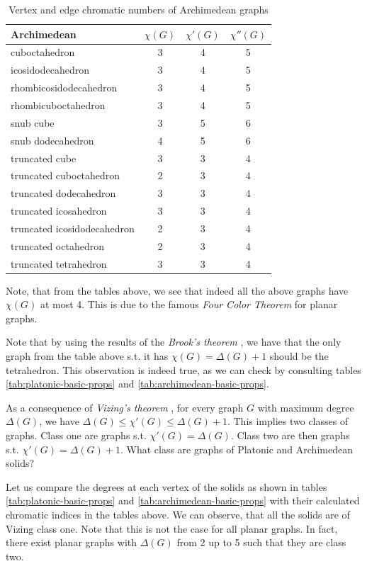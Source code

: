 \begin{table}[H]
\centering
\begin{tabular}{l@{\hspace{1.5cm}}ccc}
\toprule
\textbf{Archimedean} & \textbf{$\chi(G)$} & \textbf{$\chi'(G)$} & \textbf{$\chi''(G)$} \\
\midrule
cuboctahedron & 3 & 4 & 5 \\
icosidodecahedron & 3 & 4 & 5 \\
rhombicosidodecahedron & 3 & 4 & 5 \\
rhombicuboctahedron & 3 & 4 & 5 \\
snub cube & 3 & 5 & 6 \\
snub dodecahedron & 4 & 5 & 6 \\
truncated cube & 3 & 3 & 4 \\
truncated cuboctahedron & 2 & 3 & 4 \\
truncated dodecahedron & 3 & 3 & 4 \\
truncated icosahedron & 3 & 3 & 4 \\
truncated icosidodecahedron & 2 & 3 & 4 \\
truncated octahedron & 2 & 3 & 4 \\
truncated tetrahedron & 3 & 3 & 4 \\
\bottomrule
\end{tabular}
\caption{Vertex and edge chromatic numbers of Archimedean graphs}
\label{tab:archimedean-chrom-nums}
\end{table}

Note, that from the tables above, we see that indeed all the above graphs have $\chi(G)$ at most 4. This is due to the famous \textit{Four Color Theorem} \cite{appelhaken76} for planar graphs.

Note that by using the results of the \textit{Brook's theorem} \cite{brooks41}, we have that the only graph from the table above s.t. it has $\chi(G) = \Delta(G) + 1$ should be the tetrahedron. This observation is indeed true, as we can check by consulting tables \ref{tab:platonic-basic-props} and \ref{tab:archimedean-basic-props}. 

As a consequence of \textit{Vizing's theorem} \cite{misra92}, for every graph $G$ with maximum degree $\Delta(G)$, we have $\Delta(G) \leq \chi'(G) \leq \Delta(G) + 1$. This implies two classes of graphs. Class one are graphs s.t. $\chi'(G) = \Delta(G)$. Class two are then graphs s.t. $\chi'(G) = \Delta(G) + 1$. What class are graphs of Platonic and Archimedean solids?

Let us compare the degrees at each vertex of the solids as shown in tables \ref{tab:platonic-basic-props} and \ref{tab:archimedean-basic-props} with their calculated chromatic indices in the tables above. We can observe, that all the solids are of Vizing class one. Note that this is not the case for all planar graphs. In fact, there exist planar graphs with $\Delta(G)$ from 2 up to 5 such that they are class two.

